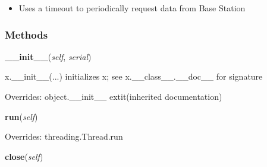 \begin{itemize}
\setlength{\parskip}{0.6ex}
  \item Uses a timeout to periodically request data from Base Station

\end{itemize}



  \subsubsection{Methods}

    \vspace{0.5ex}

\hspace{.8\funcindent}\begin{boxedminipage}{\funcwidth}

    \raggedright \textbf{\_\_init\_\_}(\textit{self}, \textit{serial})

\setlength{\parskip}{2ex}
    x.\_\_init\_\_(...) initializes x; see x.\_\_class\_\_.\_\_doc\_\_ for 
    signature

\setlength{\parskip}{1ex}
      Overrides: object.\_\_init\_\_ 	extit{(inherited documentation)}

    \end{boxedminipage}

    \vspace{0.5ex}

\hspace{.8\funcindent}\begin{boxedminipage}{\funcwidth}

    \raggedright \textbf{run}(\textit{self})

\setlength{\parskip}{2ex}
\setlength{\parskip}{1ex}
      Overrides: threading.Thread.run

    \end{boxedminipage}

    \label{sensor_thread:Sensor:close}

    \vspace{0.5ex}

\hspace{.8\funcindent}\begin{boxedminipage}{\funcwidth}

    \raggedright \textbf{close}(\textit{self})

\setlength{\parskip}{2ex}
\setlength{\parskip}{1ex}
    \end{boxedminipage}

